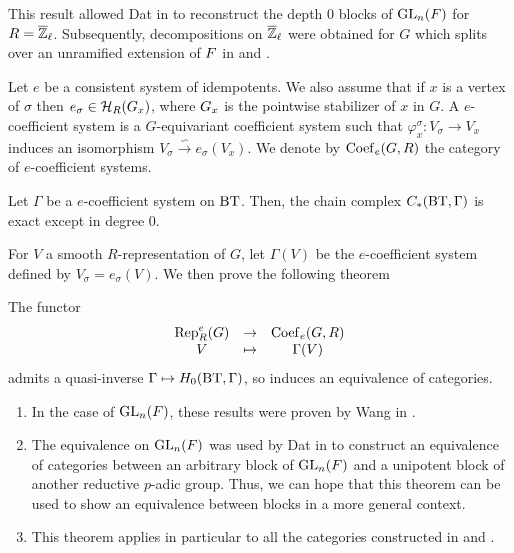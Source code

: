 \documentclass[a4paper,10pt]{amsart}
\begin{document}
\medskip

This result allowed Dat in \cite{dat_equivalences_2014} to reconstruct the depth 0 blocks of $\gl{n}(F)$ for $R=\Zl$. Subsequently, decompositions on $\Zl$ were obtained for $G$ which splits over an unramified extension of $\kk$ in \cite{lanard} and \cite{lanard2}.


\medskip

Let $e$ be a consistent system of idempotents. We also assume that if $x$ is a vertex of $\sigma$ then $e_\sigma \in \hecke{\fix{G}{x}}{R}$, where $\fix{G}{x}$ is the pointwise stabilizer of $x$ in $G$. A $e$-coefficient system is a $G$-equivariant coefficient system such that $\varphi_{x}^{\sigma} : V_{\sigma} \rightarrow V_{x}$ induces an isomorphism $V_{\sigma} \overset{\backsim}{\rightarrow} e_{\sigma}(V_{x})$. We denote by $\coef$ the category of $e$-coefficient systems.


\begin{The*}
Let $\Gamma$ be a $e$-coefficient system on $\bt$. Then, the chain complex $C_{*}(\bt,\Gamma)$ is exact except in degree 0.
\end{The*}

For $V$ a smooth $R$-representation of $G$, let $\Gamma(V)$ be the $e$-coefficient system defined by $V_\sigma=e_\sigma(V)$. We then prove the following theorem


\begin{The*}
The functor
\[\begin{array}{ccc}
 \rep[R][e]{G} & \to & \coef \\
 V & \mapsto & \Gamma(V) \\
\end{array}\]
admits a quasi-inverse $\Gamma \mapsto H_0(\bt,\Gamma)$, so induces an equivalence of categories.
\end{The*}

\begin{Rem*}
\begin{enumerate}
\item In the case of $\gl{n}(F)$, these results were proven by Wang in \cite{Wanga}.
\item The equivalence on $\gl{n}(F)$ was used by Dat in \cite{dat_equivalences_2014} to construct an equivalence of categories between an arbitrary block of $\gl{n}(F)$ and a unipotent block of another reductive $p$-adic group. Thus, we can hope that this theorem can be used to show an equivalence between blocks in a more general context.
\item This theorem applies in particular to all the categories constructed in \cite{lanard} and \cite{lanard2}.
\end{enumerate}
\end{Rem*}
\end{document}
